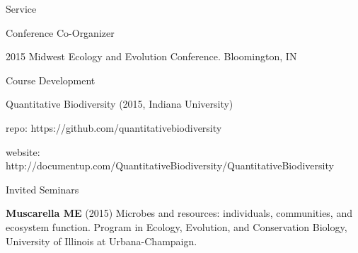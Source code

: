\documentclass{resume} %
\begin{document}
\begin{rSection}{Service}
    \begin{rSubsection}{Conference Co-Organizer}{}{}{}
        \item 2015 Midwest Ecology and Evolution Conference.
				Bloomington, IN
    \end{rSubsection}

    \begin{rSubsection}{Course Development}{}{}{}
        \item Quantitative Biodiversity (2015, Indiana University)
        \item \hspace{2ex} repo: https://github.com/quantitativebiodiversity
        \item \hspace{2ex} website:
        http://documentup.com/QuantitativeBiodiversity/QuantitativeBiodiversity
    \end{rSubsection}

\end{rSection}


\begin{rSection}{Invited Seminars}

  {\bf Muscarella ME} (2015) Microbes and resources: individuals, communities,
	and ecosystem function. Program in Ecology, Evolution, and Conservation
	Biology, University of Illinois at Urbana-Champaign.

\end{rSection}

\end{document}
